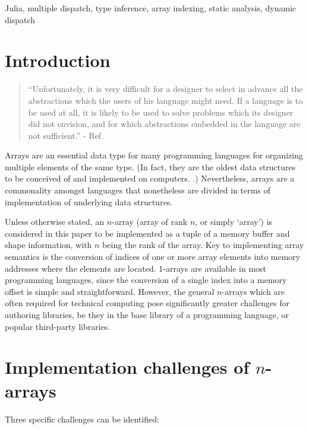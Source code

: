 \documentclass[preprint]{sigplanconf}
\begin{document}

\keywords
Julia, multiple dispatch, type inference, array indexing, static analysis,
dynamic dispatch

\section{Introduction}

\begin{quotation}
``Unfortunately, it is very difficult for a designer to select in advance all
the abstractions which the users of his language might need. If a language is
to be used at all, it is likely to be used to solve problems which its
designer did not envision, and for which abstractions embedded in the language
are not sufficient.'' - Ref. \cite{Liskov:1974pb}
\end{quotation}

Arrays are an essential data type for many programming languages for
organizing multiple elements of the same type. (In fact, they are the oldest
data structures to be conceived of and implemented on computers.
\cite{Zuse:1948ua, Rojas:2000pk, Backus:1956pr}.) Nevertheless, arrays are a
commonality amongst languages that nonetheless are divided in terms of
implementation of underlying data structures.


Unless otherwise stated, an $n$-array (array of rank $n$, or simply `array')
is considered in this paper to be implemented as a tuple of a memory buffer
and shape information, with $n$ being the rank of the array. Key to
implementing array semantics is the conversion of indices of one or more array
elements into memory addresses where the elements are located. 1-arrays are
available in most programming languages, since the conversion of a single
index into a memory offset is simple and straightforward. However, the general
$n$-arrays which are often required for technical computing pose significantly
greater challenges for authoring libraries, be they in the base library of a
programming language, or popular third-party libraries.

\section{Implementation challenges of $n$-arrays}

Three specific challenges can be identified:
\end{document}
